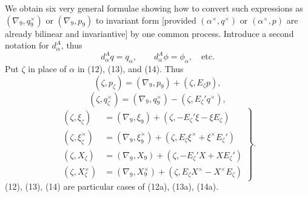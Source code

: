 \documentclass[11pt]{article}
\begin{document}
\indent We obtain six very general formulae showing how to convert such expressions as $(\nabla_9,q_9^\times)$ or $(\nabla_9,p_9)$ to invariant form [provided $(\alpha^\times,q^\times)$ or $(\alpha^\times,p)$ are already bilinear and invariantive] by one common process. Introduce a second notation for $d_\alpha^A$, thus
\[
d_\alpha^Aq=q_\alpha,\qquad d_\alpha^A\phi=\phi_\alpha,\quad\text{etc.}
\]
Put $\zeta$ in place of $\alpha$ in (12), (13), and (14). Thus
\begin{equation}(\zeta,p_\zeta)=(\nabla_9,p_9)+(\zeta,E_\zeta p),\tag{12a}\end{equation}
\begin{equation}(\zeta,q_\zeta^\times)=(\nabla_9,q_9^\times)-(\zeta,E_\zeta'q^\times),\tag{13a}\end{equation}
\begin{equation}
\left.\begin{aligned}
(\zeta,\xi_\zeta)&=(\nabla_9,\xi_9)+(\zeta,-E_\zeta'\xi-\xi E_\zeta)\\
(\zeta,\xi_\zeta^\times)&=(\nabla_9,\xi_9^\times)+(\zeta,E_\zeta\xi^\times+\xi^\times E_\zeta')\\
(\zeta,X_\zeta)&=(\nabla_9,X_9)+(\zeta,-E_\zeta'X+XE_\zeta')\\
(\zeta,X_\zeta^\times)&=(\nabla_9,X_9^\times)+(\zeta,E_\zeta X^\times-X^\times E_\zeta)
\end{aligned}\right\}.\tag{14a}
\end{equation}
(12), (13), (14) are particular cases of (12a), (13a), (14a).
\end{document}
